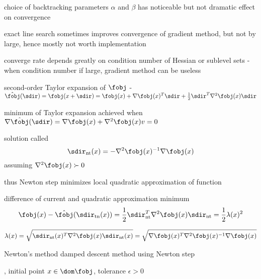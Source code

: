 \documentclass[17pt,landscape]{foils}
\begin{document}
{\vitem
	choice of backtracking parameters $\alpha$ and $\beta$
	has noticeable but not dramatic effect on convergence

\vitem
	exact line search sometimes improves convergence of gradient method,
	but not by large,
	hence mostly not worth implementation

\vitem
	converge rate depends greatly on condition number of Hessian
	or sublevel sets
	- when condition number if large, gradient method can be useless
\eit
\vfill



\bit
\item
	second-order Taylor expansion of $\fobj$
	-
	$
		\hat{\fobj}(\sdir) =
		\fobj(x + \sdir) = \fobj(x) + \nabla \fobj(x)^T \sdir + \frac{1}{2} \sdir^T \nabla^2 \fobj(x) \sdir
	$

\vitem
	minimum of Taylor expansion achieved when
	$
		\nabla \hat{\fobj}(\sdir) = \nabla \fobj(x) + \nabla^2 \fobj(x) v = 0
	$

\vitem
	solution called 
	$$
		\sdir_\mathrm{nt}(x) = - \nabla^2 \fobj(x)^{-1} \nabla \fobj(x)
	$$
	assuming $\nabla^2\fobj(x)\succ0$

\vitem
	thus Newton step minimizes local quadratic approximation of function

\vitem
	difference of current and quadratic approximation minimum
	$$
		\fobj(x) - \hat{\fobj}(\sdir_\mathrm{tn}(x))
		=
		\frac{1}{2} \sdir_\mathrm{nt}^T \nabla^2 \fobj(x) \sdir_\mathrm{nt}
		=
		\frac{1}{2} \lambda(x)^2
	$$

\vitem
	$$
		\lambda(x)
			=
		\sqrt{\sdir_\mathrm{nt}(x)^T \nabla^2 \fobj(x) \sdir_\mathrm{nt}(x)}
			=
		\sqrt{\nabla \fobj(x)^T \nabla^2 \fobj(x)^{-1} \nabla \fobj(x)}
	$$
\eit



\begin{myalgorithm}{Newton's method}
	damped descent method using Newton step
\begin{algorithmic}
\Require \fobj, initial point $x\in \dom \fobj$, tolerance $\epsilon>0$
\Loop
\EndLoop
\end{algorithmic}
\end{myalgorithm}
%

}
\end{document}
